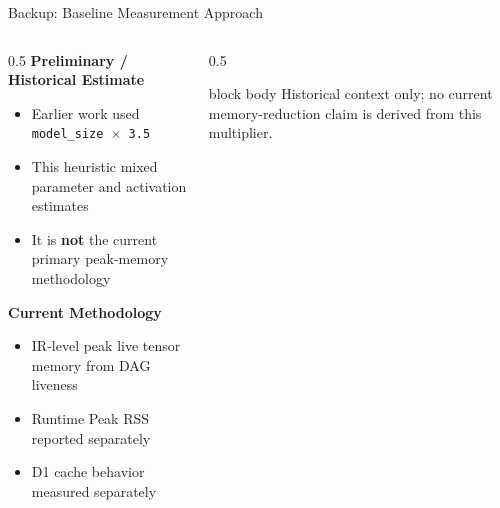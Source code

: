 \documentclass[10pt,aspectratio=169]{beamer}
\begin{document}
\begin{frame}{Backup: Baseline Measurement Approach}
\begin{columns}
\begin{column}{0.5\textwidth}
\textbf{Preliminary / Historical Estimate}
\begin{itemize}
\small
\item Earlier work used \texttt{model\_size $\times$ 3.5}
\item This heuristic mixed parameter and activation estimates
\item It is \textbf{not} the current primary peak-memory methodology
\end{itemize}

\vspace{0.25cm}
\textbf{Current Methodology}
\begin{itemize}
\small
\item IR-level peak live tensor memory from DAG liveness
\item Runtime Peak RSS reported separately
\item D1 cache behavior measured separately
\end{itemize}
\end{column}

\begin{column}{0.5\textwidth}
\centering
{}

\vspace{0.35cm}
\begin{beamercolorbox}[sep=0.25em,center,rounded=true,shadow=true]{block body}
\footnotesize Historical context only; no current memory-reduction claim is derived from this multiplier.
\end{beamercolorbox}
\end{column}
\end{columns}
\end{frame}
\end{document}
